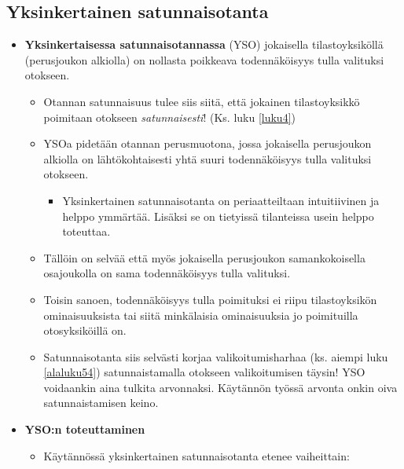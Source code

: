 \documentclass[
]{book}
\providecommand{\tightlist}{%
  \setlength{\itemsep}{0pt}\setlength{\parskip}{0pt}}
\begin{document}
\hypertarget{yksinkertainen-satunnaisotanta}{%
\subsection{Yksinkertainen satunnaisotanta}\label{yksinkertainen-satunnaisotanta}}

\begin{itemize}
\tightlist
\item
  \textbf{Yksinkertaisessa satunnaisotannassa} (YSO) jokaisella tilastoyksiköllä (perusjoukon alkiolla) on nollasta poikkeava todennäköisyys tulla valituksi otokseen.

  \begin{itemize}
  \tightlist
  \item
    Otannan satunnaisuus tulee siis siitä, että jokainen tilastoyksikkö poimitaan otokseen \emph{satunnaisesti}! (Ks. luku \ref{luku4})
  \item
    YSOa pidetään otannan perusmuotona, jossa jokaisella perusjoukon alkiolla on lähtökohtaisesti yhtä suuri todennäköisyys tulla valituksi otokseen.

    \begin{itemize}
    \tightlist
    \item
      Yksinkertainen satunnaisotanta on periaatteiltaan intuitiivinen ja helppo ymmärtää. Lisäksi se on tietyissä tilanteissa usein helppo toteuttaa.
    \end{itemize}
  \item
    Tällöin on selvää että myös jokaisella perusjoukon samankokoisella osajoukolla on sama todennäköisyys tulla valituksi.
  \item
    Toisin sanoen, todennäköisyys tulla poimituksi ei riipu tilastoyksikön ominaisuuksista tai siitä minkälaisia ominaisuuksia jo poimituilla otosyksiköillä on.
  \item
    Satunnaisotanta siis selvästi korjaa valikoitumisharhaa (ks. aiempi luku \ref{alaluku54}) satunnaistamalla otokseen valikoitumisen täysin! YSO voidaankin aina tulkita arvonnaksi. Käytännön työssä arvonta onkin oiva satunnaistamisen keino.
  \end{itemize}
\item
  \textbf{YSO:n toteuttaminen}

  \begin{itemize}
  \tightlist
  \item
    Käytännössä yksinkertainen satunnaisotanta etenee vaiheittain:


\end{itemize}
\end{itemize}
\end{document}
